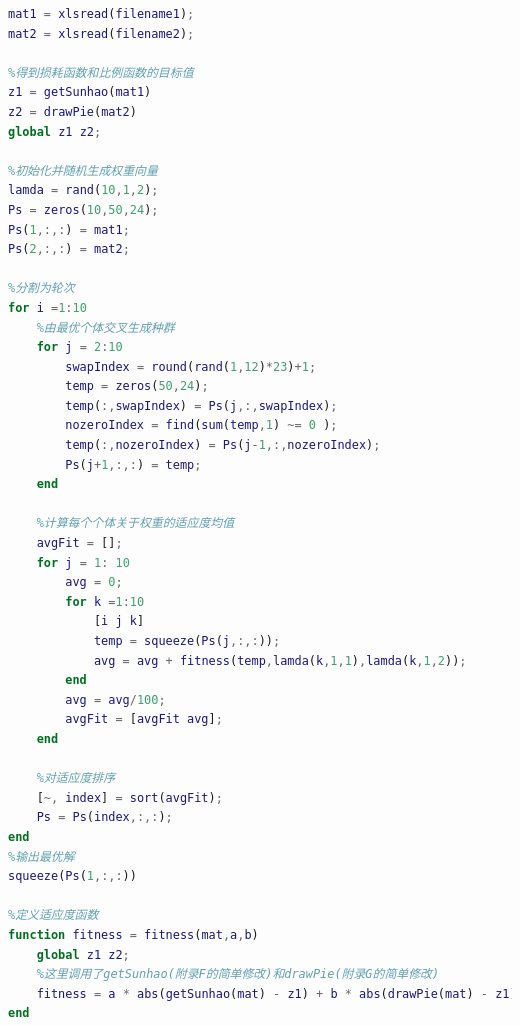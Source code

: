 \documentclass[withoutpreface,bwprint]{cumcmthesis}
\begin{document}
\begin{appendices}
\begin{lstlisting}[language = matlab]
mat1 = xlsread(filename1);
mat2 = xlsread(filename2);

%得到损耗函数和比例函数的目标值
z1 = getSunhao(mat1)
z2 = drawPie(mat2)
global z1 z2;

%初始化并随机生成权重向量
lamda = rand(10,1,2);
Ps = zeros(10,50,24);
Ps(1,:,:) = mat1; 
Ps(2,:,:) = mat2;

%分割为轮次
for i =1:10
    %由最优个体交叉生成种群
    for j = 2:10
        swapIndex = round(rand(1,12)*23)+1;
        temp = zeros(50,24);
        temp(:,swapIndex) = Ps(j,:,swapIndex);
        nozeroIndex = find(sum(temp,1) ~= 0 );
        temp(:,nozeroIndex) = Ps(j-1,:,nozeroIndex);
        Ps(j+1,:,:) = temp;
    end

    %计算每个个体关于权重的适应度均值
    avgFit = [];
    for j = 1: 10
        avg = 0;
        for k =1:10
            [i j k]
            temp = squeeze(Ps(j,:,:));
            avg = avg + fitness(temp,lamda(k,1,1),lamda(k,1,2));
        end
        avg = avg/100;
        avgFit = [avgFit avg];
    end

    %对适应度排序
    [~, index] = sort(avgFit);
    Ps = Ps(index,:,:);
end
%输出最优解
squeeze(Ps(1,:,:))

%定义适应度函数
function fitness = fitness(mat,a,b)
    global z1 z2;
    %这里调用了getSunhao(附录F的简单修改)和drawPie(附录G的简单修改)
    fitness = a * abs(getSunhao(mat) - z1) + b * abs(drawPie(mat) - z1);
end    
\end{lstlisting}

\end{appendices}
\end{document}
